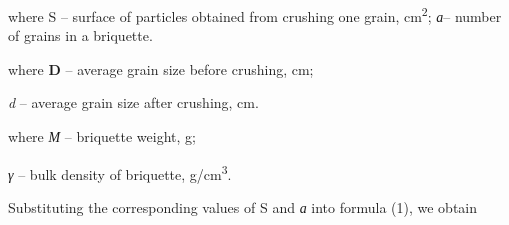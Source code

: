where S -- surface of particles obtained from crushing one grain,
cm\textsuperscript{2}; \emph{а}-- number of grains in a briquette.


where {\bfseries D} -- average grain size before crushing, cm;

\emph{d} -- average grain size after crushing, cm.


where \emph{М} -- briquette weight, g;

\emph{γ} -- bulk density of briquette, g/cm\textsuperscript{3}.

Substituting the corresponding values \hspace{0pt}\hspace{0pt}of S and
\emph{а} into formula (1), we obtain

